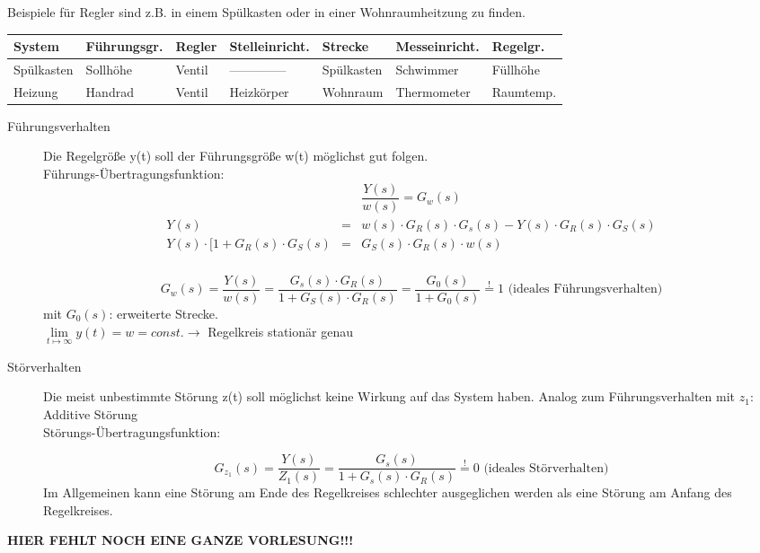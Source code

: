 \documentclass[12pt,a4paper,ngerman]{scrartcl}
\begin{document}
Beispiele für Regler sind z.B. in einem Spülkasten  oder in einer Wohnraumheitzung zu finden.
\begin{table}[H]
  \centering
  \begin{tabular}{|l||l|l|l|l|l|l|}
\hline    
 System&Führungsgr.&Regler&Stelleinricht.&Strecke&Messeinricht.&Regelgr.\\
\hline
\hline
Spülkasten&Sollhöhe&Ventil&--------------&Spülkasten&Schwimmer&Füllhöhe\\
\hline
Heizung&Handrad&Ventil&Heizkörper&Wohnraum&Thermometer&Raumtemp.\\
\hline
  \end{tabular}
\end{table}
\begin{description}
\item[Führungsverhalten] Die Regelgröße y(t) soll der Führungsgröße w(t) möglichst gut folgen. \\
Führungs-Übertragungsfunktion:
\[
\frac{Y(s)}{w(s)}=G_w(s)
\]
\begin{align*}
  \begin{array}{lll}
    Y(s)&=&w(s)\cdot G_R(s)\cdot G_s(s)-Y(s)\cdot G_R(s)\cdot G_S(s)\\
    Y(s)\cdot [1+G_R(s)\cdot G_S(s)&=&G_S(s)\cdot G_R(s)\cdot w(s)\\
  \end{array}
\end{align*}

\[G_w(s)=\frac{Y(s)}{w(s)}=\frac{G_s(s)\cdot G_R(s)}{1+G_S(s)\cdot G_R(s)}=\frac{G_0(s)}{1+G_0(s)}\stackrel{!}{=}1 \text{ (ideales Führungsverhalten)}
\]
mit $G_0(s)$: erweiterte Strecke.\\
$\lim\limits_{t\mapsto \infty}{y(t)}=w=const. \rightarrow $ Regelkreis stationär genau

\item[Störverhalten] Die meist unbestimmte Störung z(t) soll möglichst keine Wirkung auf das System haben. Analog zum Führungsverhalten mit $z_1$: Additive Störung\\
Störungs-Übertragungsfunktion:

\[
G_{z_1}(s)=\frac{Y(s)}{Z_1(s)}=\frac{G_s(s)}{1+G_s(s)\cdot G_R(s)}\stackrel{!}{=}0 \text{ (ideales Störverhalten)}
\]
Im Allgemeinen kann eine Störung am Ende des Regelkreises schlechter ausgeglichen werden als eine Störung am Anfang des Regelkreises.
\end{description}

\textbf{HIER FEHLT NOCH EINE GANZE VORLESUNG!!!}
\end{document}
